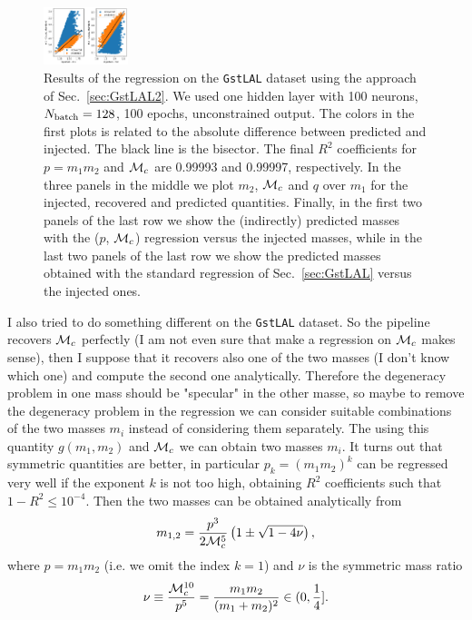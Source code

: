 \documentclass[prd,aps,twocolumn,a4paper,showkeys,nofootinbib]{revtex4-1}
\def\Mc{{\cal M}_c}
\begin{document}
\begin{figure}[]
  \includegraphics[width=0.22\textwidth]{./Figs/GstLAL_standard_m1m2.png}
  \caption{\label{fig:GstLAL2_results} Results of the regression on the \texttt{GstLAL}
  dataset using the approach of Sec.~\ref{sec:GstLAL2}. 
  We used one hidden layer with 100 neurons, $N_{\rm batch}=128$, 100 epochs,  
  unconstrained output.
  The colors in the first plots is related to the absolute difference between predicted 
  and injected. The black line is the bisector.
  The final $R^2$ coefficients for $p=m_1 m_2$ and $\Mc$ are 0.99993 and 0.99997,
  respectively.
  In the three panels in the middle we plot $m_2$, $\Mc$ and $q$ over $m_1$ for 
  the injected, recovered and predicted quantities.
  Finally, in the first two panels of the last row we show the (indirectly) predicted masses 
  with the ($p$, $\Mc$) regression versus the injected masses, 
  while in the last two panels of the last row we show the 
  predicted masses obtained with the standard regression of Sec.~\ref{sec:GstLAL} versus 
  the injected ones.}
\end{figure}
%
I also tried to do something different on the \texttt{GstLAL} dataset. 
So the pipeline recovers $\Mc$ perfectly (I am not even sure that make a regression on $\Mc$
makes sense), then I suppose that it recovers also one of the two masses 
(I don't know which one) and compute the second one analytically. Therefore the degeneracy problem
in one mass should be "specular" in the other masse, so maybe to remove the degeneracy problem
in the regression we can consider suitable combinations of the two masses $m_i$ instead of 
considering them separately. The using this quantity $g(m_1,m_2)$ and $\Mc$ we can obtain 
two masses $m_i$. It turns out that symmetric quantities are better, in particular 
$p_k= (m_1 m_2)^k$ can be regressed very well if the exponent $k$ is not too high, 
obtaining $R^2$ coefficients such that $1-R^2 \leq 10^{-4}$. Then the two masses can be
obtained analytically from
\begin{equation}
\label{eq:m12frompMc}
m_{1,2} = \frac{p^3}{2 \Mc^5}\left( 1 \pm \sqrt{1-4\nu} \right),
\end{equation}
where $p=m_1 m_2$ (i.e. we omit the index $k=1$) and $\nu$ is the symmetric mass ratio
\begin{equation}
\nu \equiv \frac{\Mc^{10}}{p^5} = \frac{m_1 m_2}{(m_1+m_2)^2}\in (0, \frac{1}{4}].
\end{equation}
\end{document}
